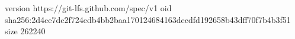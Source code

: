 version https://git-lfs.github.com/spec/v1
oid sha256:2d4ce7dc2f724edb4bb2baa170124684163decdfd192658b43dff70f7b4b3f51
size 262240
